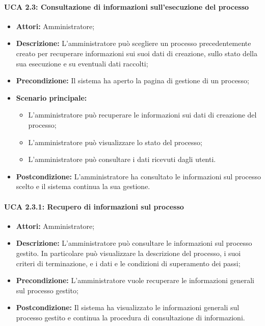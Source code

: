 \paragraph{UCA 2.3: Consultazione di informazioni sull'esecuzione del processo}
\begin{itemize}
\item \textbf{Attori:} Amministratore;
\item \textbf{Descrizione:} 
L'amministratore può scegliere un processo precedentemente creato per recuperare informazioni sui suoi dati di creazione, sullo stato della sua esecuzione e su eventuali dati raccolti; 
\item \textbf{Precondizione:} 
Il sistema ha aperto la pagina di gestione di un processo;
\item \textbf{Scenario principale:} 
\begin{itemize}
\item L'amministratore può recuperare le informazioni sui dati di creazione del processo;
\item L'amministratore può visualizzare lo stato del processo;
\item L'amministratore può consultare i dati ricevuti dagli utenti.
\end{itemize}
\item \textbf{Postcondizione:} 
L'amministratore ha consultato le informazioni sul processo scelto e il sistema continua la sua gestione.
\end{itemize}

\paragraph{UCA 2.3.1: Recupero di informazioni sul processo}
\begin{itemize}
\item \textbf{Attori:}
 Amministratore;
\item \textbf{Descrizione:} 
L'amministratore può consultare le informazioni sul processo gestito. In particolare può visualizzare la descrizione del processo, i suoi criteri di terminazione, e i dati e le condizioni di superamento dei passi; 
\item \textbf{Precondizione:} 
L'amministratore vuole recuperare le informazioni generali sul processo gestito;
\item \textbf{Postcondizione:} 
Il sistema ha visualizzato le informazioni generali sul processo gestito e continua la procedura di consultazione di informazioni.
\end{itemize}


